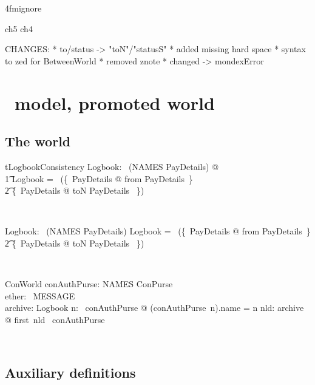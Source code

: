 \ai4fmignore{
\begin{zsection}
  \SECTION ch5 \parents ch4
\end{zsection}
CHANGES:
* to/status -> "toN"/"statusS"
* added missing hard space
* syntax to zed for BetweenWorld
* removed znote
* changed \bot -> mondexError
}
\chapter{\Betw\ model, promoted world}\label{ch5}

\section{The world}

\begin{LConsistency}
\begin{theorem}{tLogbookConsistency}
    \exists Logbook: \power~(NAMES \rel PayDetails) @ \\
        \t1 Logbook = \power~(\{~PayDetails @ from \mapsto \theta PayDetails~\} \cup \\
             \t2 \{~PayDetails @ toN \mapsto \theta PayDetails ~\})
\end{theorem}~\end{LConsistency}

\begin{LADef}
\begin{axdef}
   Logbook: \power~(NAMES \rel PayDetails)
\where
   Logbook = \power~(\{~PayDetails @ from \mapsto \theta PayDetails~\} \cup \\
      \t2 \{~PayDetails @ toN \mapsto \theta PayDetails ~\})
\end{axdef}~\end{LADef}
%
\begin{LSDef}
\begin{schema}{ConWorld}
   conAuthPurse: NAMES \finj ConPurse \\
   ether: \power~MESSAGE \\
   archive: Logbook
\where
   \forall n: \dom~conAuthPurse @ (conAuthPurse~n).name = n
   \also
   \forall nld: archive @ first~nld \in \dom~conAuthPurse
\end{schema}~\end{LSDef}


\section{Auxiliary definitions}\label{ch5.auxworld}

